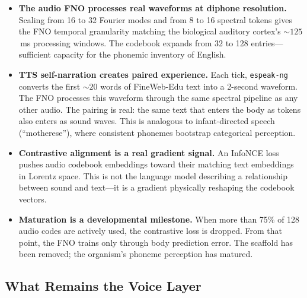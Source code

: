 \documentclass[11pt,a4paper]{article}
\begin{document}
\begin{tcolorbox}[realbox, title={Autonomous Physics: Speech-Aware Hearing}]
\begin{itemize}
  \item \textbf{The audio FNO processes real waveforms at diphone resolution.}
        Scaling from 16 to 32 Fourier modes and from 8 to 16 spectral tokens
        gives the FNO temporal granularity matching the biological auditory
        cortex's ${\sim}125$\,ms processing windows. The codebook expands from
        32 to 128 entries---sufficient capacity for the phonemic inventory of
        English.
  \item \textbf{TTS self-narration creates paired experience.}
        Each tick, \texttt{espeak-ng} converts the first ${\sim}20$ words of
        FineWeb-Edu text into a 2-second waveform. The FNO processes this
        waveform through the same spectral pipeline as any other audio. The
        pairing is real: the same text that enters the body as tokens also
        enters as sound waves. This is analogous to infant-directed speech
        (``motherese''), where consistent phonemes bootstrap categorical
        perception.
  \item \textbf{Contrastive alignment is a real gradient signal.} An InfoNCE
        loss pushes audio codebook embeddings toward their matching text
        embeddings in Lorentz space. This is not the language model describing
        a relationship between sound and text---it is a gradient physically
        reshaping the codebook vectors.
  \item \textbf{Maturation is a developmental milestone.} When more
        than 75\% of 128 audio codes are actively used, the contrastive loss
        is dropped. From that point, the FNO trains only through body
        prediction error. The scaffold has been removed; the organism's
        phoneme perception has matured.
\end{itemize}
\end{tcolorbox}

\subsection{What Remains the Voice Layer}
\end{document}
